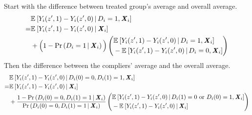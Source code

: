 Start with the difference between treated group's average and overall average.
\begin{align*}
    & \Egiven{Y_i(z', 1) - Y_i(z', 0)}{D_i = 1, \vec X_i} \\
    =& \Egiven{Y_i(z', 1) - Y_i(z', 0)}{\vec X_i} \\
    &+ \Big(1 - \Probgiven{D_i = 1}{\vec X_i} \Big)
    \left( \begin{aligned}
        &\Egiven{Y_i(z', 1) - Y_i(z', 0)}{D_i = 1, \vec X_i} \\ 
        &  - \Egiven{Y_i(z', 1) - Y_i(z', 0)}{D_i = 0, \vec X_i}
    \end{aligned} \right)
\end{align*}
Then the difference between the compliers' average and the overall average.
\begin{align*}
    & \Egiven{ Y_i(z', 1) - Y_i(z', 0)}{D_i(0) = 0, D_i(1) = 1, \vec X_i} \\
    =& \Egiven{Y_i(z', 1) - Y_i(z', 0)}{\vec X_i} \\
    & + \frac{1 - \Probgiven{D_i(0) = 0, D_i(1) = 1}{\vec X_i} }{
        \Probgiven{D_i(0) = 0, D_i(1) = 1}{\vec X_i}}
    \left( \begin{aligned}
        &\Egiven{Y_i(z', 1) - Y_i(z', 0)}{D_i(1) = 0 \text{ or } D_i(0)=1, \vec X_i} \\ 
        &  - \Egiven{Y_i(z', 1) - Y_i(z', 0)}{\vec X_i}
    \end{aligned} \right)
\end{align*}

